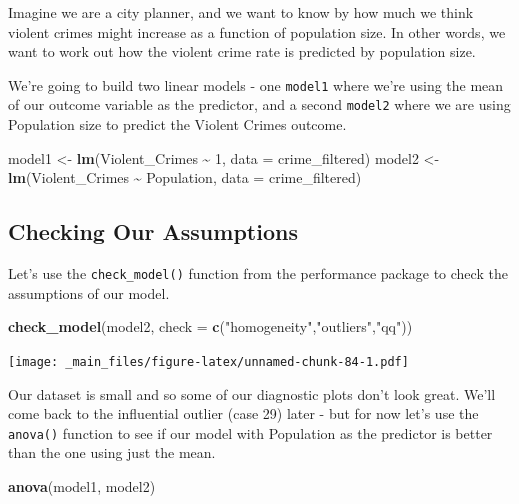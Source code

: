 \documentclass[
]{book}
\newenvironment{Shaded}{\begin{snugshade}}{\end{snugshade}}
\newcommand{\AttributeTok}[1]{\textcolor[rgb]{0.13,0.29,0.53}{#1}}
\newcommand{\DecValTok}[1]{\textcolor[rgb]{0.00,0.00,0.81}{#1}}
\newcommand{\FunctionTok}[1]{\textcolor[rgb]{0.13,0.29,0.53}{\textbf{#1}}}
\newcommand{\NormalTok}[1]{#1}
\newcommand{\OtherTok}[1]{\textcolor[rgb]{0.56,0.35,0.01}{#1}}
\newcommand{\SpecialCharTok}[1]{\textcolor[rgb]{0.81,0.36,0.00}{\textbf{#1}}}
\newcommand{\StringTok}[1]{\textcolor[rgb]{0.31,0.60,0.02}{#1}}
\begin{document}
Imagine we are a city planner, and we want to know by how much we think violent crimes might increase as a function of population size. In other words, we want to work out how the violent crime rate is predicted by population size.

We're going to build two linear models - one \texttt{model1} where we're using the mean of our outcome variable as the predictor, and a second \texttt{model2} where we are using Population size to predict the Violent Crimes outcome.

\begin{Shaded}
\begin{Highlighting}[]
\NormalTok{model1 }\OtherTok{\textless{}{-}} \FunctionTok{lm}\NormalTok{(Violent\_Crimes }\SpecialCharTok{\textasciitilde{}} \DecValTok{1}\NormalTok{, }\AttributeTok{data =}\NormalTok{ crime\_filtered)}
\NormalTok{model2 }\OtherTok{\textless{}{-}} \FunctionTok{lm}\NormalTok{(Violent\_Crimes }\SpecialCharTok{\textasciitilde{}}\NormalTok{ Population, }\AttributeTok{data =}\NormalTok{ crime\_filtered)}
\end{Highlighting}
\end{Shaded}

\hypertarget{checking-our-assumptions}{%
\subsection{Checking Our Assumptions}\label{checking-our-assumptions}}

Let's use the \texttt{check\_model()} function from the performance package to check the assumptions of our model.

\begin{Shaded}
\begin{Highlighting}[]
\FunctionTok{check\_model}\NormalTok{(model2, }\AttributeTok{check =} \FunctionTok{c}\NormalTok{(}\StringTok{"homogeneity"}\NormalTok{,}\StringTok{"outliers"}\NormalTok{,}\StringTok{"qq"}\NormalTok{))}
\end{Highlighting}
\end{Shaded}

\texttt{[image: \_main\_files/figure-latex/unnamed-chunk-84-1.pdf]}

Our dataset is small and so some of our diagnostic plots don't look great. We'll come back to the influential outlier (case 29) later - but for now let's use the \texttt{anova()} function to see if our model with Population as the predictor is better than the one using just the mean.

\begin{Shaded}
\begin{Highlighting}[]
\FunctionTok{anova}\NormalTok{(model1, model2)}
\end{Highlighting}
\end{Shaded}
\end{document}
